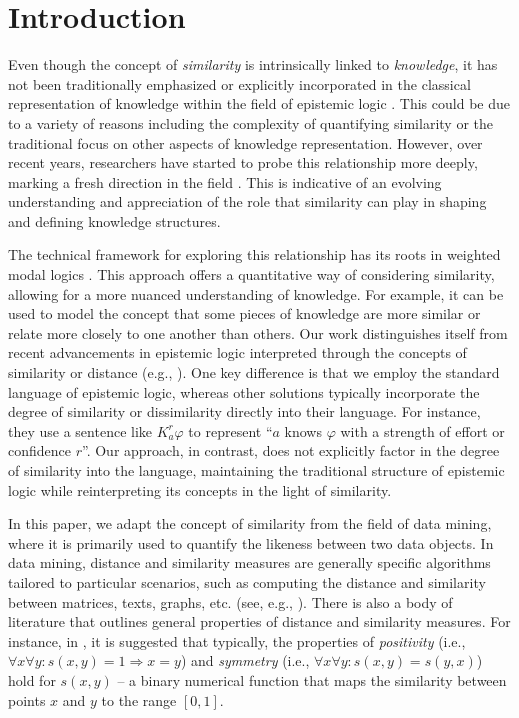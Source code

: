 \documentclass{article}
\renewcommand{\phi}{\varphi}
\newcommand{\Ra}{\Rightarrow}
\begin{document}
\section{Introduction}

Even though the concept of \emph{similarity} is intrinsically linked to \emph{knowledge}, it has not been traditionally emphasized or explicitly incorporated in the classical representation of knowledge within the field of epistemic logic \cite{Hintikka1962,FHMV1995,MvdH1995}. This could be due to a variety of reasons including the complexity of quantifying similarity or the traditional focus on other aspects of knowledge representation. However, over recent years, researchers have started to probe this relationship more deeply, marking a fresh direction in the field \cite{DLW2021,NT2015}. This is indicative of an evolving understanding and appreciation of the role that similarity can play in shaping and defining knowledge structures.

The technical framework for exploring this relationship has its roots in weighted modal logics \cite{LM2014,HLMP2018}. This approach offers a quantitative way of considering similarity, allowing for a more nuanced understanding of knowledge. For example, it can be used to model the concept that some pieces of knowledge are more similar or relate more closely to one another than others. Our work distinguishes itself from recent advancements in epistemic logic interpreted through the concepts of similarity or distance (e.g., \cite{DLW2021,NT2015}).  One key difference is that we employ the standard language of epistemic logic, whereas other solutions typically incorporate the degree of similarity or dissimilarity directly into their language. For instance, they use a sentence like $K_a^r \phi$ to represent ``$a$ knows $\phi$ with a strength of effort or confidence $r$''. Our approach, in contrast, does not explicitly factor in the degree of similarity into the language, maintaining the traditional structure of epistemic logic while reinterpreting its concepts in the light of similarity.

In this paper, we adapt the concept of similarity from the field of data mining, where it is primarily used to quantify the likeness between two data objects. In data mining, distance and similarity measures are generally specific algorithms tailored to particular scenarios, such as computing the distance and similarity between matrices, texts, graphs, etc. (see, e.g., \cite[Chapter~3]{Aggarwal2015}). There is also a body of literature that outlines general properties of distance and similarity measures. For instance, in \cite{TSK2005}, it is suggested that typically, the properties of \emph{positivity} (i.e., $\forall x \forall y: s(x, y) = 1 \Ra x = y$) and \emph{symmetry} (i.e., $\forall x \forall y: s(x, y) = s(y, x)$) hold for $s(x, y)$ -- a binary numerical function that maps the similarity between points $x$ and $y$ to the range $[0, 1]$.
\end{document}
